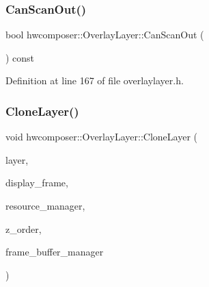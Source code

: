 \subsubsection{\texorpdfstring{Can\+Scan\+Out()}{CanScanOut()}}
{\footnotesize\ttfamily bool hwcomposer\+::\+Overlay\+Layer\+::\+Can\+Scan\+Out (\begin{DoxyParamCaption}{ }\end{DoxyParamCaption}) const\hspace{0.3cm}{\ttfamily [inline]}}



Definition at line 167 of file overlaylayer.\+h.


\begin{DoxyCode}{0}
\end{DoxyCode}
\mbox{\label{structhwcomposer_1_1OverlayLayer_a223dac50fd143c675ae0a85e8e4c1ad7}} 
\subsubsection{\texorpdfstring{Clone\+Layer()}{CloneLayer()}}
{\footnotesize\ttfamily void hwcomposer\+::\+Overlay\+Layer\+::\+Clone\+Layer (\begin{DoxyParamCaption}\item[{const \mbox{\hyperlink{structhwcomposer_1_1OverlayLayer}{Overlay\+Layer}} $\ast$}]{layer,  }\item[{const Hwc\+Rect$<$ int $>$ \&}]{display\+\_\+frame,  }\item[{\mbox{\hyperlink{classhwcomposer_1_1ResourceManager}{Resource\+Manager}} $\ast$}]{resource\+\_\+manager,  }\item[{uint32\+\_\+t}]{z\+\_\+order,  }\item[{\mbox{\hyperlink{classhwcomposer_1_1FrameBufferManager}{Frame\+Buffer\+Manager}} $\ast$}]{frame\+\_\+buffer\+\_\+manager }\end{DoxyParamCaption})}



